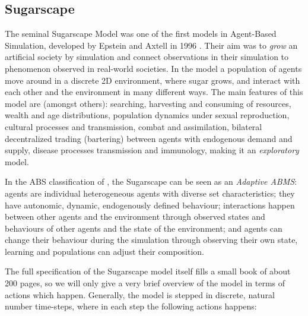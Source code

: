 \subsection{Sugarscape}
\label{sec:sugarscape}

The seminal Sugarscape Model was one of the first models in Agent-Based Simulation, developed by Epstein and Axtell in 1996 \cite{epstein_growing_1996}. Their aim was to \textit{grow} an artificial society by simulation and connect observations in their simulation to phenomenon observed in real-world societies. In the model a population of agents move around in a discrete 2D environment, where sugar grows, and interact with each other and the environment in many different ways. The main features of this model are (amongst others): searching, harvesting and consuming of resources, wealth and age distributions, population dynamics under sexual reproduction, cultural processes and transmission, combat and assimilation, bilateral decentralized trading (bartering) between agents with endogenous demand and supply, disease processes transmission and immunology, making it an \textit{exploratory} model.

In the ABS classification of \cite{macal_everything_2016}, the Sugarscape can be seen as an \textit{Adaptive ABMS}: agents are individual heterogeneous agents with diverse set characteristics; they have autonomic, dynamic, endogenously defined behaviour; interactions happen between other agents and the environment through observed states and behaviours of other agents and the state of the environment; and agents can change their behaviour during the simulation through observing their own state, learning and populations can adjust their composition.

The full specification of the Sugarscape model itself fills a small book \cite{epstein_growing_1996} of about 200 pages, so we will only give a very brief overview of the model in terms of actions which happen. Generally, the model is stepped in discrete, natural number time-steps, where in each step the following actions happens:

